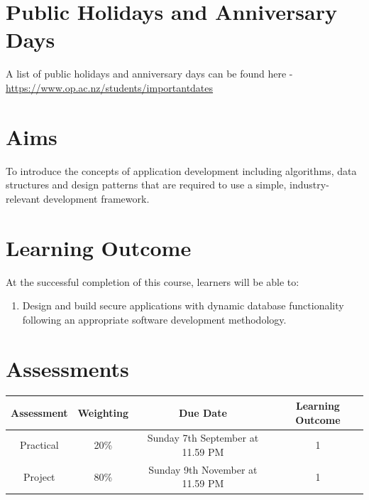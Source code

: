 \documentclass{article}
\begin{document}
\section*{Public Holidays and Anniversary Days}
A list of public holidays and anniversary days can be found here - \href{https://www.op.ac.nz/students/importantdates}{https://www.op.ac.nz/students/importantdates}

\section*{Aims}
To introduce the concepts of application development including algorithms, data structures and design patterns that are required to use a simple, industry-relevant development framework.

\section*{Learning Outcome}
At the successful completion of this course, learners will be able to:
\begin{enumerate}
	\item Design and build secure applications with dynamic database functionality following an appropriate software development methodology.
\end{enumerate}

\section*{Assessments}
\renewcommand{\arraystretch}{1.5}
\begin{tabular}{|c|c|c|c|}
	\hline
	\textbf{Assessment}                                 & \textbf{Weighting} & \textbf{Due Date}            & \textbf{Learning Outcome} \\ \hline
	\small Practical & \small 20\%        & \small Sunday 7th September at 11.59 PM  & \small 1                   \\ \hline
	\small Project                 & \small 80\%        & \small Sunday 9th November at 11.59 PM \small  & \small 1                   \\ \hline
\end{tabular}
\end{document}
